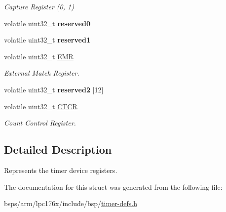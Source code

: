 \begin{DoxyCompactItemize}
\begin{DoxyCompactList}\small\item\em Capture Register (0, 1) \end{DoxyCompactList}\item 
\mbox{\label{structlpc176x__timer__device_a2c1749d3a71f82cd4b4b186c30815c1f}} 
volatile uint32\+\_\+t {\bfseries reserved0}
\item 
\mbox{\label{structlpc176x__timer__device_a4661ded6c56b45d7a16fc42239a1b716}} 
volatile uint32\+\_\+t {\bfseries reserved1}
\item 
\mbox{\label{structlpc176x__timer__device_a3f47114885e033809c0fa7b09344973a}} 
volatile uint32\+\_\+t \mbox{\hyperlink{structlpc176x__timer__device_a3f47114885e033809c0fa7b09344973a}{E\+MR}}
\begin{DoxyCompactList}\small\item\em External Match Register. \end{DoxyCompactList}\item 
\mbox{\label{structlpc176x__timer__device_aa13e56508fecc99ebe1cacaf283e9a74}} 
volatile uint32\+\_\+t {\bfseries reserved2} \mbox{[}12\mbox{]}
\item 
\mbox{\label{structlpc176x__timer__device_adb472a4a526962681d4ea468c6d8bb4c}} 
volatile uint32\+\_\+t \mbox{\hyperlink{structlpc176x__timer__device_adb472a4a526962681d4ea468c6d8bb4c}{C\+T\+CR}}
\begin{DoxyCompactList}\small\item\em Count Control Register. \end{DoxyCompactList}\end{DoxyCompactItemize}


\subsection{Detailed Description}
Represents the timer device registers. 

The documentation for this struct was generated from the following file\+:\begin{DoxyCompactItemize}
\item 
bsps/arm/lpc176x/include/bsp/\mbox{\hyperlink{timer-defs_8h}{timer-\/defs.\+h}}\end{DoxyCompactItemize}
